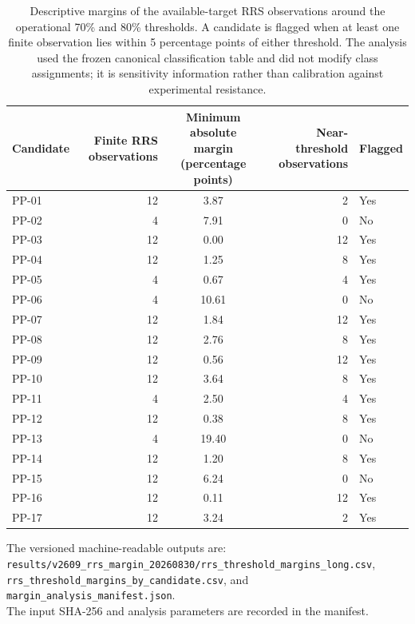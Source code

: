 \begin{table}[htbp]
\centering
\scriptsize
\caption{Descriptive margins of the available-target RRS observations around the operational 70\% and 80\% thresholds. A candidate is flagged when at least one finite observation lies within 5 percentage points of either threshold. The analysis used the frozen canonical classification table and did not modify class assignments; it is sensitivity information rather than calibration against experimental resistance.}
\label{tab:s18_rrs_margin_sensitivity}
\begin{tabularx}{\textwidth}{l r S[table-format=2.2] r l}
\toprule
Candidate & {Finite RRS observations} & {Minimum absolute margin (percentage points)} & {Near-threshold observations} & {Flagged} \\
\midrule
PP-01 & 12 & 3.87 & 2 & Yes \\
PP-02 & 4 & 7.91 & 0 & No \\
PP-03 & 12 & 0.00 & 12 & Yes \\
PP-04 & 12 & 1.25 & 8 & Yes \\
PP-05 & 4 & 0.67 & 4 & Yes \\
PP-06 & 4 & 10.61 & 0 & No \\
PP-07 & 12 & 1.84 & 12 & Yes \\
PP-08 & 12 & 2.76 & 8 & Yes \\
PP-09 & 12 & 0.56 & 12 & Yes \\
PP-10 & 12 & 3.64 & 8 & Yes \\
PP-11 & 4 & 2.50 & 4 & Yes \\
PP-12 & 12 & 0.38 & 8 & Yes \\
PP-13 & 4 & 19.40 & 0 & No \\
PP-14 & 12 & 1.20 & 8 & Yes \\
PP-15 & 12 & 6.24 & 0 & No \\
PP-16 & 12 & 0.11 & 12 & Yes \\
PP-17 & 12 & 3.24 & 2 & Yes \\
\bottomrule
\end{tabularx}
\end{table}

\noindent The versioned machine-readable outputs are:\\ 
\quad\texttt{results/v2609\_rrs\_margin\_20260830/rrs\_threshold\_margins\_long.csv},\\ 
\quad\texttt{rrs\_threshold\_margins\_by\_candidate.csv}, and\\ 
\quad\texttt{margin\_analysis\_manifest.json}.\\ 
The input SHA-256 and analysis parameters are recorded in the manifest.
